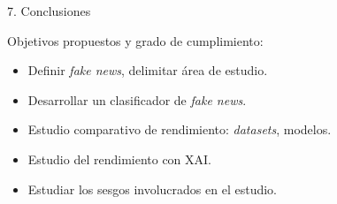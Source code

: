 \begin{frame}{7. Conclusiones}

Objetivos propuestos y grado de cumplimiento:
\begin{itemize}
    \item Definir \textit{fake news}, delimitar área de estudio.
    \item Desarrollar un clasificador de \textit{fake news}.
    \item Estudio comparativo de rendimiento: \textit{datasets}, modelos.
    \item Estudio del rendimiento con XAI.
    \item Estudiar los sesgos involucrados en el estudio.
\end{itemize}

\end{frame}